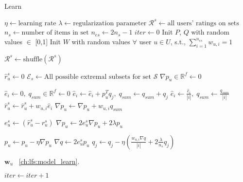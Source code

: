 \begin{algorithm}
  \caption{Learn \ES}
  \label{alg:alg-lfs-esarm}
  \begin{algorithmic}[1]
    \State $\eta \gets  \text{learning rate}$
    \State $\lambda \gets \text{regularization parameter}$
    \State $\mathcal{R}^s \gets \text{all users' ratings on sets}$  
    \State $n_s \gets \text{number of items in set}$
    \State $n_{es} \gets 2n_s - 1$ 
    \State $iter \gets 0$
    \State Init $P$, $Q$ with random values $\in$ [0,1] 
    \State Init $W$ with random values $\forall$ user $u \in U$, s.t.,
    $\sum_{i=1}^{n_{es}}w_{u,i}=1$
    
    

      \State $\mathcal{R}^s \gets \text{shuffle}(\mathcal{R}^s)$
      \State 
        
        \State $\hat{r}_{u}^s \gets 0$
        \State $\mathcal{E}_s \gets \text{All possible extremal subsets
        for set }\mathcal{S}$
        \State         
        \State $\nabla p_u \in \mathbb{R}^f \gets 0$ 
        
          \State $\hat{e}_i \gets 0,\; q_{sum} \in \mathbb{R}^f \gets 0$
            \State $\hat{e}_i \gets \hat{e}_i + p_u^Tq_j, \; q_{sum} \gets q_{sum} + q_j$
          \EndFor
          \State $\hat{e}_i \gets \frac{\hat{e}_i}{|i|},\; q_{sum} \gets \frac{q_{sum}}{|i|}$
          \State $\hat{r}_{u}^s \gets \hat{r}_{u}^s + w_{u,i}\hat{e}_i$
          \State $\nabla p_u \gets \nabla p_u + w_{u,i}q_{sum}$
        \EndFor
        
        \State $e_{u}^s \gets (\hat{r}_{u}^s - r_{u}^s)$
        \State $\nabla p_u \gets 2e_{u}^s\nabla p_u +
        2\lambda p_u$ 
 
        \State $p_u \gets p_u - \eta \nabla p_u$
        \State         
        \State $\nabla q \gets 2e_u^s p_u$
          \State $q_j \gets q_j - \eta (\frac{w_{u,i}{\nabla q} }{|i|} +
            2\frac{\lambda}{n_s}q_j)$  
          \EndFor  
        \EndFor

      \EndFor
      
      \State
        \State {} $\bm{w}_u$  
        \State {}~\ref{ch:lfs:model_learn}. 
      \EndFor

      \State
      \State $iter \gets iter + 1$
    \EndWhile

    \EndProcedure
  \end{algorithmic}
\end{algorithm}


